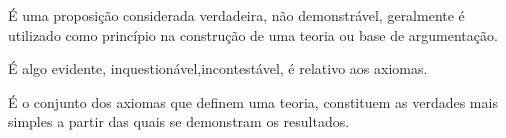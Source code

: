 \documentclass[../../main]{subfiles}
\begin{document}
    \begin{defi}[Axioma]\label{defi:axioma}
        É uma proposição considerada verdadeira, não demonstrável, geralmente é utilizado como princípio na construção de uma teoria ou base de argumentação.
    \end{defi}

    \begin{defi}[Axiomático]\label{defi:axiomatico}
        É algo evidente, inquestionável,\newline incontestável, é relativo aos axiomas.
    \end{defi}

    \begin{defi}\label{defi:sistema-axiomatico}
        É o conjunto dos axiomas que definem uma teoria, constituem as verdades mais simples a partir das quais se demonstram os resultados.
    \end{defi}
\end{document}
